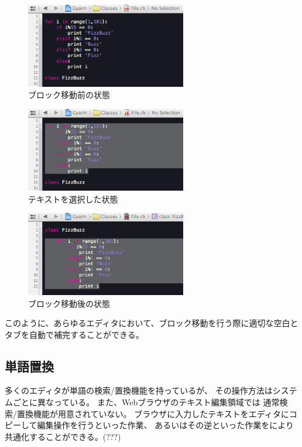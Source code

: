 \begin{figure}[H]
\centerline{\includegraphics[width=70mm,bb=0 0 360 190]{figures/indent1.png}}
\caption{ブロック移動前の状態}
\label{indent1}
\end{figure}

\begin{figure}[H]
\centerline{\includegraphics[width=70mm,bb=0 0 360 190]{figures/indent2.png}}
\caption{テキストを選択した状態}
\label{indent2}
\end{figure}

\begin{figure}[H]
\centerline{\includegraphics[width=70mm,bb=0 0 360 190]{figures/indent3.png}}
\caption{ブロック移動後の状態}
\label{indent3}
\end{figure}

このように、あらゆるエディタにおいて、ブロック移動を行う際に適切な空白とタブを自動で補完することができる。

\subsection{単語置換}

多くのエディタが単語の検索/置換機能を持っているが、
その操作方法はシステムごとに異なっている。
また、Webブラウザのテキスト編集領域では
通常検索/置換機能が用意されていない。
ブラウザに入力したテキストをエディタにコピーして編集操作を行うといった作業、
あるいはその逆といった作業を{\system}により共通化することができる。(???)

